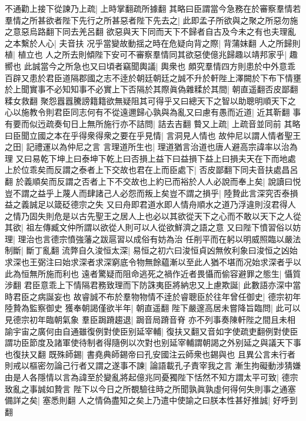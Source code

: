 不通勸上接下從諫乃上疏|{
	上時掌翻疏所據翻}
其略曰臣謂當今急務在於審察羣情若羣情之所甚欲者陛下先行之所甚惡者陛下先去之|{
	此即孟子所欲與之聚之所惡勿施之意惡烏路翻下同去羌呂翻}
欲惡與天下同而天下不歸者自古及今未之有也夫理亂之本繫於人心|{
	夫音扶}
况乎當變故動揺之時在危疑向背之際|{
	背蒲妺翻}
人之所歸則植|{
	植立也}
人之所去則傾陛下安可不審察羣情同其欲惡使億兆歸趣以靖邦家乎|{
	趣嚮也}
此誠當今之所急也又曰頃者竊聞輿議|{
	輿衆也}
頗究羣情四方則患於中外意乖百辟又患於君臣道隔郡國之志不逹於朝廷朝廷之誠不升於軒陛上澤闕於下布下情壅於上聞實事不必知知事不必實上下否隔於其際眞偽雜糅於其間|{
	朝直遥翻否皮鄙翻糅女救翻}
聚怨囂囂騰謗籍籍欲無疑阻其可得乎又曰總天下之智以助聰明順天下之心以施教令則君臣同志何有不從遠邇歸心孰與為亂又曰慮有愚而近道|{
	近其靳翻}
事有要而似迃疏奏旬日上無所施行亦不詰問|{
	詰去吉翻}
䞇又上疏|{
	上疏音並同前}
其略曰臣聞立國之本在乎得衆得衆之要在乎見情|{
	言洞見人情也}
故仲尼以謂人情者聖王之田|{
	記禮運以為仲尼之言}
言理道所生也|{
	理道猶言治道也唐人避高宗諱率以治為理}
又曰易乾下坤上曰泰坤下乾上曰否損上益下曰益損下益上曰損夫天在下而地處上於位乖矣而反謂之泰者上下交故也君在上而臣處下|{
	否皮鄙翻下同夫音扶處昌呂翻}
於義順矣而反謂之否者上下不交故也上約已而裕於人人必說而奉上矣|{
	說讀曰悦}
豈不謂之益乎上蔑人而肆諸己人必怨而叛上矣豈不謂之損乎|{
	陸贄此言深究否泰損益之義誠足以箴砭德宗之失}
又曰舟即君道水即人情舟順水之道乃浮違則沒君得人之情乃固失則危是以古先聖王之居人上也必以其欲從天下之心而不敢以天下之人從其欲|{
	祖左傳臧文仲所謂以欲從人則可以人從欲鮮濟之語之意}
又曰陛下憤習俗以妨理|{
	理治也言德宗憤強藩之跋扈習以成俗有妨為治}
任削平而在躬以明威照臨以嚴法制斷|{
	斷丁亂翻}
流弊自久浚恒太深|{
	易恒之初六曰浚恒貞凶無攸利象曰浚恒之凶始求深也王弼注曰始求深者求深窮底令物無餘藴漸以至此人猶不堪而况始求深者乎以此為恒無所施而利也}
遠者驚疑而阻命逃死之禍作近者畏懾而偷容避罪之態生|{
	懾質涉翻}
君臣意乖上下情隔君務致理而下防誅夷臣將納忠又上慮欺誕|{
	此數語亦深中當時君臣之病誕妄也}
故睿誠不布於羣物物情不逹於睿聰臣於往年曾任御史|{
	德宗初年陸贄為監察御史}
獲奉朝謁僅欲半年|{
	朝直遥翻}
陛下嚴邃高居未嘗降旨臨問|{
	此可以見德宗初年臨朝氣象}
羣臣跼蹐趨退|{
	跼音局蹐音脊}
亦不列事奏陳軒陛之間且未相諭宇宙之廣何由自通雖復例對使臣别延宰輔|{
	復扶又翻又音如字使疏吏翻例對使臣謂功臣節度及諸軍使待制者得隨例以次對也别延宰輔謂朝謁之外别延之與議天下事也復扶又翻}
既殊師錫|{
	書堯典師錫帝曰孔安國注云師衆也錫與也}
且異公言未行者則戒以樞密勿論己行者又謂之遂事不諫|{
	論語載孔子責宰我之言}
漸生拘礙動涉猜嫌由是人各隱情以言為諱至於變亂將起億兆同憂獨陛下恬然不知方謂太平可致|{
	德宗致亂之事誠如贄言}
陛下以今日之所覩驗往時之所聞孰眞孰虛何得何失則事之通塞備詳之矣|{
	塞悉則翻}
人之情偽盡知之矣上乃遣中使諭之曰朕本性甚好推誠|{
	好呼到翻}
